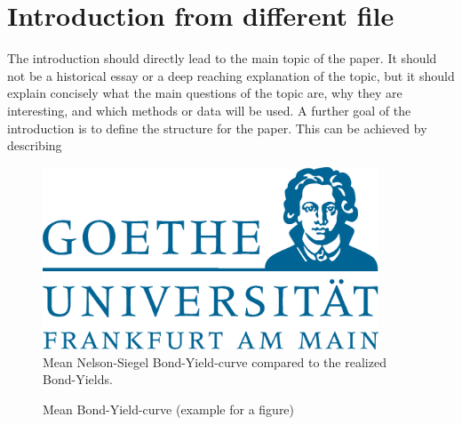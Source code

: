 \section{Introduction from different file}

The introduction should directly lead to the main topic of the paper. It
should not be a historical essay or a deep reaching explanation of
the topic, but it should explain concisely what the main questions
of the topic are, why they are interesting, and which methods or
data will be used. A further goal of the introduction is to define the
structure for the paper. This can be achieved by describing

\begin{figure}[!h]
\begin{center}\caption{Mean Bond-Yield-curve (example for a figure)\label{fig:average2}}
\includegraphics[width=100mm]{GU-Logo-blau-CMYK.eps}\\
\tiny Mean Nelson-Siegel Bond-Yield-curve compared to the realized
Bond-Yields.
\end{center}
\end{figure}


